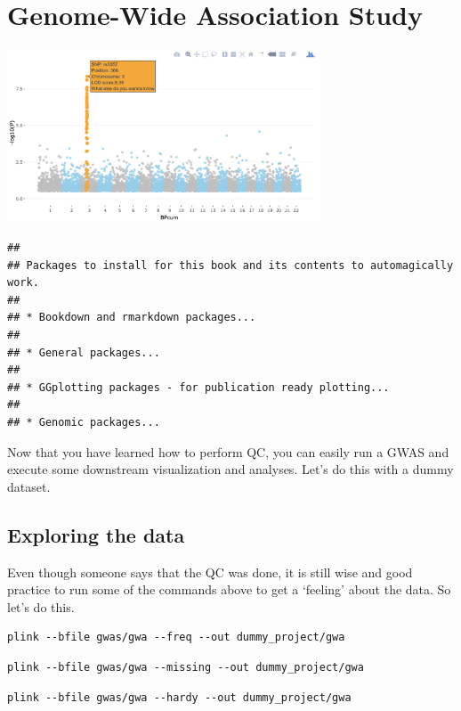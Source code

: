 \documentclass[
]{book}
\begin{document}
\hypertarget{gwas-testing}{%
\chapter{Genome-Wide Association Study}\label{gwas-testing}}

\includegraphics[width=0.7\textwidth,height=\textheight]{./img/_gwas/interactive_plot.png}

\begin{lstlisting}
## 
## Packages to install for this book and its contents to automagically work.
## 
## * Bookdown and rmarkdown packages...
## 
## * General packages...
## 
## * GGplotting packages - for publication ready plotting...
## 
## * Genomic packages...
\end{lstlisting}

Now that you have learned how to perform QC, you can easily run a GWAS and execute some downstream visualization and analyses. Let's do this with a dummy dataset.

\hypertarget{exploring-the-data}{%
\section{Exploring the data}\label{exploring-the-data}}

Even though someone says that the QC was done, it is still wise and good practice to run some of the commands above to get a `feeling' about the data. So let's do this.

\begin{lstlisting}
plink --bfile gwas/gwa --freq --out dummy_project/gwa
\end{lstlisting}

\begin{lstlisting}
plink --bfile gwas/gwa --missing --out dummy_project/gwa
\end{lstlisting}

\begin{lstlisting}
plink --bfile gwas/gwa --hardy --out dummy_project/gwa
\end{lstlisting}
\end{document}
